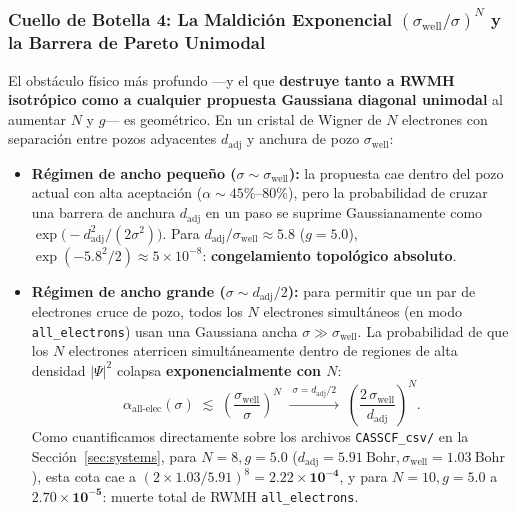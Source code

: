 \documentclass[10pt,a4paper]{article}
\begin{document}
\subsubsection*{Cuello de Botella 4: La Maldición Exponencial $(\sigma_{\mathrm{well}}/\sigma)^N$ y la Barrera de Pareto Unimodal}
El obstáculo físico más profundo —y el que \textbf{destruye tanto a RWMH isotrópico como a cualquier propuesta Gaussiana diagonal unimodal} al aumentar $N$ y $g$— es geométrico. En un cristal de Wigner de $N$ electrones con separación entre pozos adyacentes $d_{\mathrm{adj}}$ y anchura de pozo $\sigma_{\mathrm{well}}$:
\begin{itemize}
\item \textbf{Régimen de ancho pequeño ($\sigma \sim \sigma_{\mathrm{well}}$):} la propuesta cae dentro del pozo actual con alta aceptación ($\alpha \sim 45\%\text{--}80\%$), pero la probabilidad de cruzar una barrera de anchura $d_{\mathrm{adj}}$ en un paso se suprime Gaussianamente como $\exp\!\big(-d_{\mathrm{adj}}^2 / (2\sigma^2)\big)$. Para $d_{\mathrm{adj}}/\sigma_{\mathrm{well}} \approx 5.8$ ($g=5.0$), $\exp(-5.8^2/2) \approx 5\times 10^{-8}$: \textbf{congelamiento topológico absoluto}.
\item \textbf{Régimen de ancho grande ($\sigma \sim d_{\mathrm{adj}}/2$):} para permitir que un par de electrones cruce de pozo, todos los $N$ electrones simultáneos (en modo \texttt{all\_electrons}) usan una Gaussiana ancha $\sigma \gg \sigma_{\mathrm{well}}$. La probabilidad de que los $N$ electrones aterricen simultáneamente dentro de regiones de alta densidad $|\Psi|^2$ colapsa \textbf{exponencialmente con $N$}:
\begin{equation}
\alpha_{\mathrm{all\text{-}elec}}(\sigma) \;\lesssim\; \left(\frac{\sigma_{\mathrm{well}}}{\sigma}\right)^N \;\xrightarrow{\;\sigma = d_{\mathrm{adj}}/2\;}\; \left(\frac{2\,\sigma_{\mathrm{well}}}{d_{\mathrm{adj}}}\right)^N.
\label{eq:exp_curse}
\end{equation}
Como cuantificamos directamente sobre los archivos \texttt{CASSCF\_csv/} en la Sección~\ref{sec:systems}, para $N=8, g=5.0$ ($d_{\mathrm{adj}}=5.91\ \mathrm{Bohr}, \sigma_{\mathrm{well}}=1.03\ \mathrm{Bohr}$), esta cota cae a $(2\times 1.03 / 5.91)^8 = \mathbf{2.22\times 10^{-4}}$, y para $N=10, g=5.0$ a $\mathbf{2.70\times 10^{-5}}$: muerte total de RWMH \texttt{all\_electrons}.
\end{itemize}
\end{document}
